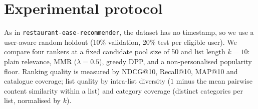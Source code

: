 \section{Experimental protocol}
As in \texttt{restaurant-ease-recommender}, the dataset has no timestamp,
so we use a user-aware random holdout (10\% validation, 20\% test per
eligible user). We compare four rankers at a fixed candidate pool size of
50 and list length $k=10$: plain relevance, MMR ($\lambda=0.5$), greedy DPP,
and a non-personalised popularity floor. Ranking quality is measured by
NDCG@10, Recall@10, MAP@10 and catalogue coverage; list quality by
intra-list diversity ($1$ minus the mean pairwise content similarity within
a list) and category coverage (distinct categories per list, normalised by
$k$).
